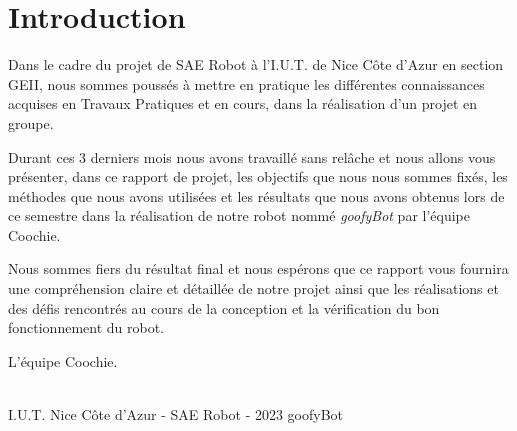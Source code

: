 \section{Introduction}
\setlength{\parindent}{5ex}
Dans le cadre du projet de SAE Robot à l'I.U.T. de Nice Côte d'Azur en section GEII, nous sommes poussés à mettre en pratique les différentes connaissances acquises en Travaux Pratiques et en cours, dans la réalisation d’un projet en groupe. 

Durant ces 3 derniers mois nous avons travaillé sans relâche et nous allons vous présenter, dans ce rapport de projet, les objectifs que nous nous sommes fixés, les méthodes que nous avons utilisées et les résultats que nous avons obtenus lors de ce semestre dans la réalisation de notre robot nommé \emph{goofyBot} par l'équipe Coochie.

Nous sommes fiers du résultat final et nous espérons que ce rapport vous fournira une compréhension claire et détaillée de notre projet ainsi que les réalisations et des défis rencontrés au cours de la conception et la vérification du bon fonctionnement du robot.

\hfill L'équipe Coochie.

\vfill
\noindent\makebox[\linewidth]{\rule{.8\paperwidth}{.6pt}}\\[0.2cm]
I.U.T. Nice Côte d'Azur - SAE Robot - 2023 \hfill goofyBot
\noindent\makebox[\linewidth]{\rule{.8\paperwidth}{.6pt}}

\newpage